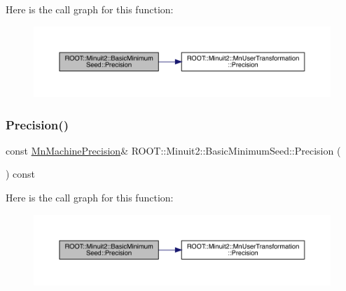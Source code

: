 Here is the call graph for this function\+:
\nopagebreak
\begin{figure}[H]
\begin{center}
\leavevmode
\includegraphics[width=350pt]{de/d50/classROOT_1_1Minuit2_1_1BasicMinimumSeed_af06c66e8851f7314915e01e0bedb200c_cgraph}
\end{center}
\end{figure}
\mbox{\label{classROOT_1_1Minuit2_1_1BasicMinimumSeed_af06c66e8851f7314915e01e0bedb200c}} 
\subsubsection{\texorpdfstring{Precision()}{Precision()}\hspace{0.1cm}{\footnotesize\ttfamily [2/3]}}
{\footnotesize\ttfamily const \mbox{\hyperlink{classROOT_1_1Minuit2_1_1MnMachinePrecision}{Mn\+Machine\+Precision}}\& R\+O\+O\+T\+::\+Minuit2\+::\+Basic\+Minimum\+Seed\+::\+Precision (\begin{DoxyParamCaption}{ }\end{DoxyParamCaption}) const\hspace{0.3cm}{\ttfamily [inline]}}

Here is the call graph for this function\+:
\nopagebreak
\begin{figure}[H]
\begin{center}
\leavevmode
\includegraphics[width=350pt]{de/d50/classROOT_1_1Minuit2_1_1BasicMinimumSeed_af06c66e8851f7314915e01e0bedb200c_cgraph}
\end{center}
\end{figure}
\mbox{\label{classROOT_1_1Minuit2_1_1BasicMinimumSeed_af06c66e8851f7314915e01e0bedb200c}} 
